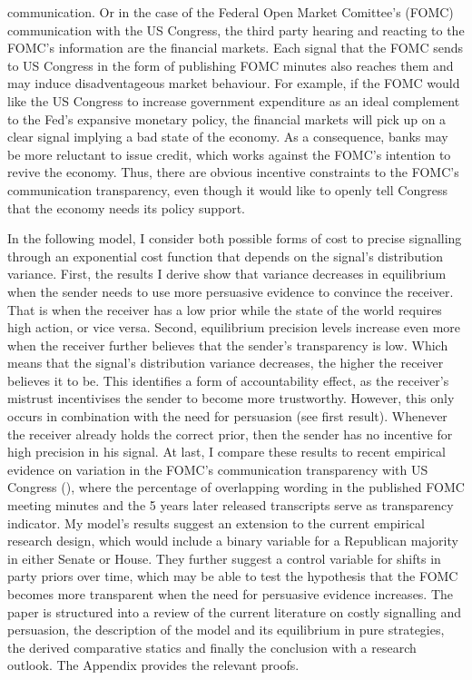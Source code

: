 \documentclass[paper=a4,12pt,DIV=11,twoside=false]{scrartcl}
\begin{document}
communication. Or in the case of the Federal Open Market Comittee's (FOMC) communication with the US Congress, the third party hearing and reacting to the FOMC's information are the financial markets. Each signal that the FOMC sends to US Congress in the form of publishing FOMC minutes also reaches them and may induce disadventageous market behaviour. For example, if the FOMC would like the US Congress to increase government expenditure as an ideal complement to the Fed's expansive monetary policy, the financial markets will pick up on a clear signal implying a bad state of the economy. As a consequence, banks may be more reluctant to issue credit, which works against the FOMC's intention to revive the economy. Thus, there are obvious incentive constraints to the FOMC's communication transparency, even though it would like to openly tell Congress that the economy needs its policy support.

In the following model, I consider both possible forms of cost to precise signalling through an exponential cost function that depends on the signal's distribution variance. First, the results I derive show that variance decreases in equilibrium when the sender needs to use more persuasive evidence to convince the receiver. That is when the receiver has a low prior while the state of the world requires high action, or vice versa. Second, equilibrium precision levels increase even more when the receiver further believes that the sender's transparency is low. Which means that the signal's distribution variance decreases, the higher the receiver believes it to be. This identifies a form of accountability effect, as the receiver's mistrust incentivises the sender to become more trustworthy. However, this only occurs in combination with the need for persuasion (see first result). Whenever the receiver already holds the correct prior, then the sender has no incentive for high precision in his signal. At last, I compare these results to recent empirical evidence on variation in the FOMC's communication transparency with US Congress (\citet{GL2017}), where the percentage of overlapping wording in the published FOMC meeting minutes and the 5 years later released transcripts serve as transparency indicator. My model's results suggest an extension to the current empirical research design, which would include a binary variable for a Republican majority in either Senate or House. They further suggest a control variable for shifts in party priors over time, which may be able to test the hypothesis that the FOMC becomes more transparent when the need for persuasive evidence increases. The paper is structured into a review of the current literature on costly signalling and persuasion, the description of the model and its equilibrium in pure strategies, the derived comparative statics and finally the conclusion with a research outlook. The Appendix provides the relevant proofs.
\end{document}
